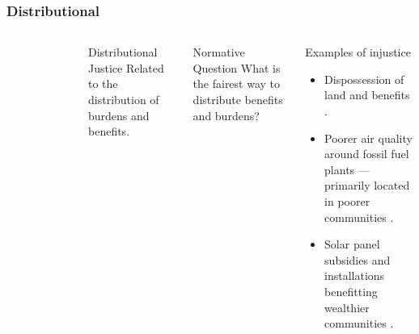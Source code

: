 \begin{frame}
    \frametitle{Distributional}
    \begin{columns}
        \column[t]{3cm}
        \begin{figure}
            \centering
        \end{figure}
        \column[t]{7cm}
        \begin{block}{Distributional Justice}
            Related to the distribution of burdens and benefits.
        \end{block}
        \begin{block}{Normative Question}
            What is the fairest way to distribute benefits and burdens?
        \end{block}
        \begin{block}{Examples of injustice}
            \begin{itemize}
                \item Dispossession of land and benefits \cite{yenneti_spatial_2016,sovacool_dispossessed_2021}. 
                \item Poorer air quality around fossil fuel plants --- primarily located in poorer communities \cite{mohai_which_2015}.
                \item Solar panel subsidies and installations benefitting wealthier communities \cite{reames_distributional_2020}.
            \end{itemize}
        \end{block}
    \end{columns}
    
\end{frame}

